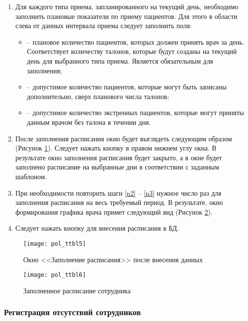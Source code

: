 \begin{enumerate}
 \item Для каждого типа приема, запланированного на текущий день, необходимо заполнить плановые показатели по приему пациентов. Для этого в области слева от данных интервала приема следует заполнить поля:
 \begin{itemize}
  \item {} -- плановое количество пациентов, которых должен принять врач за день. Соответствует количеству талонов, которые будут созданы на текущий день для выбранного типа приема. Является обязательным для заполнения;
  \item {} -- допустимое количество пациентов, которые могут быть записаны дополнительно, сверх планового числа талонов;
  \item {} -- допустимое количество экстренных пациентов, которые могут приняты данным врачом без талона в течении дня.
 \end{itemize}
 \item \label{n3} После заполнения расписания окно будет выглядеть следующим образом (Рисунок \ref{img_pol_ttbl5}). Следует нажать кнопку  в правом нижнем углу окна. В результате окно заполнения расписания будет закрыто, а в окне  будет заполнено расписание на выбранные дни в соответствии с заданным шаблоном. 
  \item При необходимости повторить шаги \ref{n2} -- \ref{n3} нужное число раз для заполнения расписания на весь требуемый период. В результате, окно формирования графика врача примет следующий вид (Рисунок \ref{img_pol_ttbl6}). 
 \item Следует нажать кнопку  для внесения расписания в БД. 
\end{enumerate}

\begin{figure}[ht]\centering
 \texttt{[image: pol\_ttbl5]}
 \caption{Окно <<Заполнение расписания>> после внесения данных}
 \label{img_pol_ttbl5}
\end{figure}

\begin{figure}[ht]\centering
 \texttt{[image: pol\_ttbl6]}
 \caption{Заполненное расписание сотрудника}
 \label{img_pol_ttbl6}
\end{figure}

\subsubsection{Регистрация отсутствий сотрудников}

